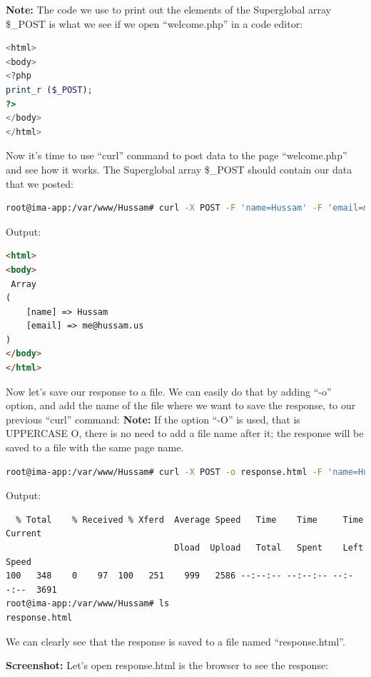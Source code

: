 \documentclass[a4paper, 11pt]{article}
\begin{document}
\textbf{Note:}
The code we use to print out the elements of the Superglobal array \$\_POST is what we see if we open ``welcome.php'' in a code editor:

\begin{lstlisting}[language=php]
<html>
<body>
<?php
print_r ($_POST); 
?>
</body>
</html>
\end{lstlisting}

Now it's time to use ``curl'' command to post data to the page ``welcome.php'' and see how it works. The Superglobal array \$\_POST should contain our data that we posted:

\begin{lstlisting}[language=bash] 
root@ima-app:/var/www/Hussam# curl -X POST -F 'name=Hussam' -F 'email=me@hussam.us' http://www.cs.odu.edu/~hhallak/532/A1/Q1/welcome.php

\end{lstlisting}
Output:
\begin{lstlisting}[language=html]
<html>
<body>
 Array
(
    [name] => Hussam
    [email] => me@hussam.us
)
</body>
</html> 

\end{lstlisting}

Now let's save our response to a file. We can easily do that by adding ``-o'' option, and add the name of the file where we want to save the response, to our previous ``curl'' command:
\textbf{Note:}
If the option ``-O'' is used, that is UPPERCASE O, there is no need to add a file name after it; the response will be saved to a file with the same page name.

\begin{lstlisting}[language=bash]
root@ima-app:/var/www/Hussam# curl -X POST -o response.html -F 'name=Hussam' -F 'email=me@hussam.us' http://www.cs.odu.edu/~hhallak/532/A1/Q1/welcome.php

\end{lstlisting}
Output:
\begin{lstlisting} 
  % Total    % Received % Xferd  Average Speed   Time    Time     Time  Current
                                 Dload  Upload   Total   Spent    Left  Speed
100   348    0    97  100   251    999   2586 --:--:-- --:--:-- --:--:--  3691
root@ima-app:/var/www/Hussam# ls
response.html
\end{lstlisting}
We can clearly see that the response is saved to a file named ``response.html''.

\textbf{Screenshot:}
 Let's open response.html is the browser to see the response:
\end{document}
